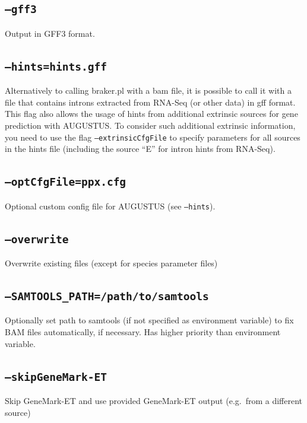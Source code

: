 \documentclass[a4paper,10pt]{report}
\begin{document}
\subsection{\texttt{--gff3}}                               Output in GFF3 format.
\subsection{\texttt{--hints=hints.gff}}                    Alternatively to calling braker.pl with a bam file, it is 
                                         possible to call it with a file that contains introns extracted 
                                         from RNA-Seq (or other data) in gff format. This flag also allows the usage
                                         of hints from additional extrinsic sources for gene prediction 
                                         with AUGUSTUS. To consider such additional extrinsic information,
                                         you need to use the flag \texttt{--extrinsicCfgFile} to specify parameters for 
                                         all sources in the hints file
                                         (including the source ``E'' for intron hints from RNA-Seq).
\subsection{\texttt{--optCfgFile=ppx.cfg}}                 Optional custom config file for AUGUSTUS (see \texttt{--hints}).
\subsection{\texttt{--overwrite}}                          Overwrite existing files (except for species parameter files)
\subsection{\texttt{--SAMTOOLS\_PATH=/path/to/samtools}}            Optionally set path to samtools (if not specified as environment 
variable) to fix BAM files automatically, if necessary. Has higher     
                                         priority than environment variable.
\subsection{\texttt{--skipGeneMark-ET}}                    Skip GeneMark-ET and use provided GeneMark-ET output (e.g.~from a
                                         different source) 
\end{document}
